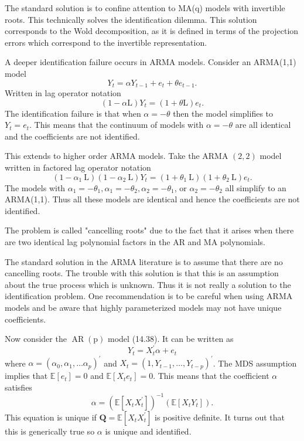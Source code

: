\documentclass[10pt]{article}
\begin{document}
The standard solution is to confine attention to MA(q) models with invertible roots. This technically solves the identification dilemma. This solution corresponds to the Wold decomposition, as it is defined in terms of the projection errors which correspond to the invertible representation.

A deeper identification failure occurs in ARMA models. Consider an ARMA(1,1) model
$$
Y_{t}=\alpha Y_{t-1}+e_{t}+\theta e_{t-1} .
$$
Written in lag operator notation
$$
(1-\alpha \mathrm{L}) Y_{t}=(1+\theta \mathrm{L}) e_{t} .
$$
The identification failure is that when $\alpha=-\theta$ then the model simplifies to $Y_{t}=e_{t}$. This means that the continuum of models with $\alpha=-\theta$ are all identical and the coefficients are not identified.

This extends to higher order ARMA models. Take the ARMA $(2,2)$ model written in factored lag operator notation
$$
\left(1-\alpha_{1} \mathrm{~L}\right)\left(1-\alpha_{2} \mathrm{~L}\right) Y_{t}=\left(1+\theta_{1} \mathrm{~L}\right)\left(1+\theta_{2} \mathrm{~L}\right) e_{t} .
$$
The models with $\alpha_{1}=-\theta_{1}, \alpha_{1}=-\theta_{2}, \alpha_{2}=-\theta_{1}$, or $\alpha_{2}=-\theta_{2}$ all simplify to an ARMA(1,1). Thus all these models are identical and hence the coefficients are not identified.

The problem is called "cancelling roots" due to the fact that it arises when there are two identical lag polynomial factors in the AR and MA polynomials.

The standard solution in the ARMA literature is to assume that there are no cancelling roots. The trouble with this solution is that this is an assumption about the true process which is unknown. Thus it is not really a solution to the identification problem. One recommendation is to be careful when using ARMA models and be aware that highly parameterized models may not have unique coefficients.

Now consider the $\operatorname{AR}(\mathrm{p})$ model (14.38). It can be written as
$$
Y_{t}=X_{t}^{\prime} \alpha+e_{t}
$$
where $\alpha=\left(\alpha_{0}, \alpha_{1}, \ldots \alpha_{p}\right)^{\prime}$ and $X_{t}=\left(1, Y_{t-1}, \ldots, Y_{t-p}\right)^{\prime}$. The MDS assumption implies that $\mathbb{E}\left[e_{t}\right]=0$ and $\mathbb{E}\left[X_{t} e_{t}\right]=0$. This means that the coefficient $\alpha$ satisfies
$$
\alpha=\left(\mathbb{E}\left[X_{t} X_{t}^{\prime}\right]\right)^{-1}\left(\mathbb{E}\left[X_{t} Y_{t}\right]\right) .
$$
This equation is unique if $\boldsymbol{Q}=\mathbb{E}\left[X_{t} X_{t}^{\prime}\right]$ is positive definite. It turns out that this is generically true so $\alpha$ is unique and identified.
\end{document}
